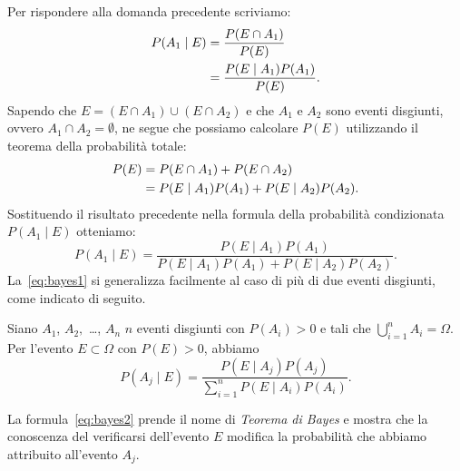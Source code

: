 \noindent
Per rispondere alla domanda precedente scriviamo:
\begin{align}
P(A_1 \mid E) &= \frac{P(E \cap A_1)}{P(E)}\notag\\ 
&= \frac{P(E \mid A_1)P(A_1)}{P(E)}\notag.
\end{align}
Sapendo che $E = (E \cap A_1) \cup (E \cap A_2)$ e che  $A_1$ e $A_2$ sono eventi disgiunti, ovvero $A_1 \cap A_2 = \emptyset$, ne segue che possiamo calcolare $P(E)$ utilizzando il teorema della probabilità totale:
\begin{align}
P(E) &= P(E \cap A_1) + P(E \cap A_2)\notag\\ 
&= P(E \mid A_1)P(A_1) + P(E \mid A_2)P(A_2).\notag
\end{align}
Sostituendo il risultato precedente nella formula della probabilità condizionata $P(A_1 \mid E)$ otteniamo:
\begin{equation}
P(A_1 \mid E) = \frac{P(E \mid A_1)P(A_1)}{P(E \mid A_1)P(A_1) + P(E \mid A_2)P(A_2)}.
\label{eq:bayes1}
\end{equation}
La~\eqref{eq:bayes1} si generalizza facilmente al caso di più di due eventi disgiunti, come indicato di seguito.

\begin{teorema}
Siano $A_1$, $A_2,$ \dots, $A_n$ $n$ eventi disgiunti con $P(A_i) > 0$ e tali che $\bigcup_{i=1}^{n} A_i = \Omega$.  
Per l'evento $E \subset \Omega$  con $P(E) > 0$, abbiamo
\begin{equation}
P(A_j \mid E) = \frac{P(E \mid A_j)P(A_j)}{\sum_{i=1}^{n}P(E \mid A_i)P(A_i)}.
\label{eq:bayes2}
\end{equation}
\end{teorema}
\noindent
La formula~\eqref{eq:bayes2} prende il nome di \emph{Teorema di Bayes} e mostra che la conoscenza del verificarsi dell'evento $E$ modifica la probabilità che abbiamo attribuito all'evento $A_j$.


